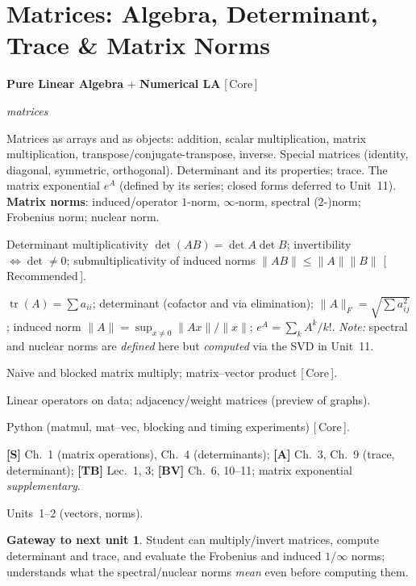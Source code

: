 \documentclass[11pt]{article}
\newcommand{\dom}[1]{{\sffamily\bfseries\color{RoyalBlue}#1}}
\newcommand{\pri}[1]{{\footnotesize\sffamily\color{BrickRed}[\,#1\,]}}
\newcommand{\obj}[1]{{\itshape #1}}
\newenvironment{unitfields}
  {\begin{description}[leftmargin=0pt,labelindent=0pt,style=nextline,
      font=\normalfont\sffamily\bfseries\color{RoyalBlue},itemsep=3pt,topsep=4pt]}
  {\end{description}}
\newcommand{\ff}[1]{\item[#1]}
\theoremstyle{definition}
\newtheorem*{gateway}{Gateway to next unit}
\begin{document}
\section{Matrices: Algebra, Determinant, Trace \& Matrix Norms}
\begin{unitfields}
\ff{Domain(s)} \dom{Pure Linear Algebra} + \dom{Numerical LA} \pri{Core}
\ff{Primary object(s)} \obj{matrices}
\ff{Topics}
  Matrices as arrays and as objects: addition, scalar multiplication, matrix
  multiplication, transpose/conjugate-transpose, inverse. Special matrices
  (identity, diagonal, symmetric, orthogonal). Determinant and its properties;
  trace. The matrix exponential $e^{A}$ (defined by its series; closed forms
  deferred to Unit~11). \textbf{Matrix norms}: induced/operator $1$-norm,
  $\infty$-norm, spectral ($2$-)norm; Frobenius norm; nuclear norm.
\ff{Key theorems}
  Determinant multiplicativity $\det(AB)=\det A\det B$; invertibility
  $\iff\det\neq 0$; submultiplicativity of induced norms
  $\|AB\|\le\|A\|\|B\|$ \pri{Recommended}.
\ff{Tools / formulas}
  $\operatorname{tr}(A)=\sum a_{ii}$; determinant (cofactor and via
  elimination); $\|A\|_F=\sqrt{\sum a_{ij}^2}$; induced norm
  $\|A\|=\sup_{x\neq0}\|Ax\|/\|x\|$; $e^{A}=\sum_k A^k/k!$.
  \emph{Note:} spectral and nuclear norms are \emph{defined} here but
  \emph{computed} via the SVD in Unit~11.
\ff{Algorithms}
  Naive and blocked matrix multiply; matrix--vector product \pri{Core}.
\ff{Applications}
  Linear operators on data; adjacency/weight matrices (preview of graphs).
\ff{Languages}
  Python (matmul, mat--vec, blocking and timing experiments) \pri{Core}.
\ff{Textbook refs}
  \textbf{[S]} Ch.~1 (matrix operations), Ch.~4 (determinants);
  \textbf{[A]} Ch.~3, Ch.~9 (trace, determinant);
  \textbf{[TB]} Lec.~1, 3; \textbf{[BV]} Ch.~6, 10--11;
  matrix exponential \emph{supplementary}.
\ff{ENTER} Units~1--2 (vectors, norms).
\end{unitfields}
\begin{gateway}
Student can multiply/invert matrices, compute determinant and trace, and
evaluate the Frobenius and induced $1/\infty$ norms; understands what the
spectral/nuclear norms \emph{mean} even before computing them.
\end{gateway}

\end{document}
